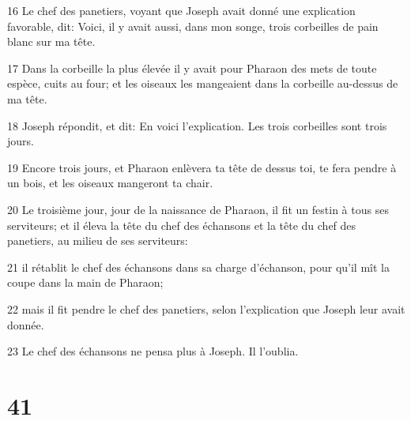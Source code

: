 \par 16 Le chef des panetiers, voyant que Joseph avait donné une explication favorable, dit: Voici, il y avait aussi, dans mon songe, trois corbeilles de pain blanc sur ma tête.
\par 17 Dans la corbeille la plus élevée il y avait pour Pharaon des mets de toute espèce, cuits au four; et les oiseaux les mangeaient dans la corbeille au-dessus de ma tête.
\par 18 Joseph répondit, et dit: En voici l'explication. Les trois corbeilles sont trois jours.
\par 19 Encore trois jours, et Pharaon enlèvera ta tête de dessus toi, te fera pendre à un bois, et les oiseaux mangeront ta chair.
\par 20 Le troisième jour, jour de la naissance de Pharaon, il fit un festin à tous ses serviteurs; et il éleva la tête du chef des échansons et la tête du chef des panetiers, au milieu de ses serviteurs:
\par 21 il rétablit le chef des échansons dans sa charge d'échanson, pour qu'il mît la coupe dans la main de Pharaon;
\par 22 mais il fit pendre le chef des panetiers, selon l'explication que Joseph leur avait donnée.
\par 23 Le chef des échansons ne pensa plus à Joseph. Il l'oublia.

\chapter{41}


